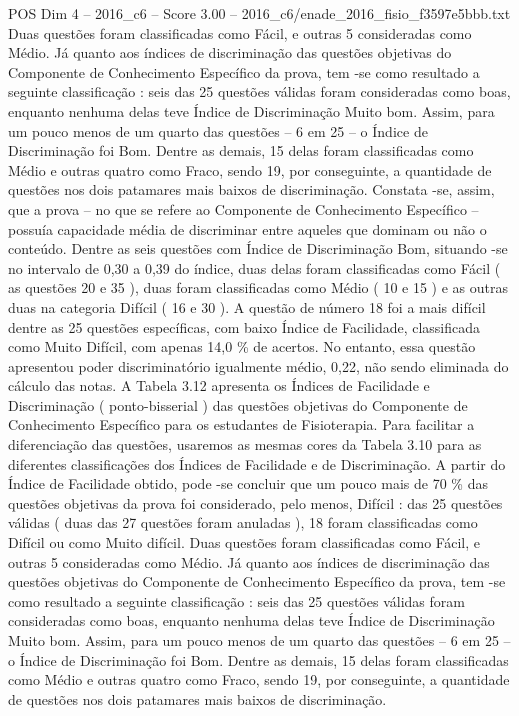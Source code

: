 \begin{textsample}{POS Dim 4 – 2016\_c6 – Score 3.00 – 2016\_c6/enade\_2016\_fisio\_f3597e5bbb.txt}
Duas questões foram classificadas como Fácil, e outras 5 consideradas como Médio.
Já quanto aos índices de discriminação das questões objetivas do Componente de Conhecimento Específico da prova, tem -se como resultado a seguinte classificação : seis das 25 questões válidas foram consideradas como boas, enquanto nenhuma delas teve Índice de Discriminação Muito bom.
Assim, para um pouco menos de um quarto das questões – 6 em 25 – o Índice de Discriminação foi Bom.
Dentre as demais, 15 delas foram classificadas como Médio e outras quatro como Fraco, sendo 19, por conseguinte, a quantidade de questões nos dois patamares mais baixos de discriminação.
Constata -se, assim, que a prova – no que se refere ao Componente de Conhecimento Específico – possuía capacidade média de discriminar entre aqueles que dominam ou não o conteúdo.
Dentre as seis questões com Índice de Discriminação Bom, situando -se no intervalo de 0,30 a 0,39 do índice, duas delas foram classificadas como Fácil ( as questões 20 e 35 ), duas foram classificadas como Médio ( 10 e 15 ) e as outras duas na categoria Difícil ( 16 e 30 ).
A questão de número 18 foi a mais difícil dentre as 25 questões específicas, com baixo Índice de Facilidade, classificada como Muito Difícil, com apenas 14,0 \% de acertos.
No entanto, essa questão apresentou poder discriminatório igualmente médio, 0,22, não sendo eliminada do cálculo das notas.
A Tabela 3.12 apresenta os Índices de Facilidade e Discriminação ( ponto-bisserial ) das questões objetivas do Componente de Conhecimento Específico para os estudantes de Fisioterapia.
Para facilitar a diferenciação das questões, usaremos as mesmas cores da Tabela 3.10 para as diferentes classificações dos Índices de Facilidade e de Discriminação.
A partir do Índice de Facilidade obtido, pode -se concluir que um pouco mais de 70 \% das questões objetivas da prova foi considerado, pelo menos, Difícil : das 25 questões válidas ( duas das 27 questões foram anuladas ), 18 foram classificadas como Difícil ou como Muito difícil.
Duas questões foram classificadas como Fácil, e outras 5 consideradas como Médio.
Já quanto aos índices de discriminação das questões objetivas do Componente de Conhecimento Específico da prova, tem -se como resultado a seguinte classificação : seis das 25 questões válidas foram consideradas como boas, enquanto nenhuma delas teve Índice de Discriminação Muito bom.
Assim, para um pouco menos de um quarto das questões – 6 em 25 – o Índice de Discriminação foi Bom.
Dentre as demais, 15 delas foram classificadas como Médio e outras quatro como Fraco, sendo 19, por conseguinte, a quantidade de questões nos dois patamares mais baixos de discriminação.

\end{textsample}
